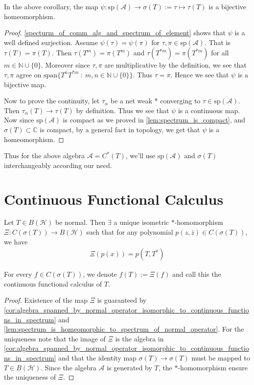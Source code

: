 \begin{lemma}
  \label{lem:spectrum_is_homeomorphic_to_spectrum_of_normal_operator}
  In the above corollary, the map $\psi: \textrm{sp}(\mathcal{A}) \to
  \sigma(T) := \tau \mapsto \tau(T)$ is a bijective homeomorphism.
\end{lemma}
\begin{proof}
  \autoref{specturm_of_comm_alg_and_spectrum_of_element} shows that
  $\psi$ is a well defined surjection. Assume $\psi(\tau) =
  \psi(\pi)$ for $ \tau, \pi \in \textrm{sp}(\mathcal{A})$.
  That is $\tau(T) = \pi(T)$. Then $\tau(T^m) = \pi(T^m)$
  and $\tau(T^{*m}) = \pi(T^{*m})$ for all $m \in \mathbb{N} \cup \{
  0 \}$. Moreover since $\tau, \pi$ are multiplicative by the
  definition, we see that $\tau, \pi$ agree on $\textrm{span}\{
  T^nT^{*m}  \ : \   m, n \in \mathbb{N} \cup \{ 0 \} \}$. Thus $\tau
  = \pi$. Hence we see that $\psi$ is a bijective map.

  Now to prove the continuity, let $\tau_\alpha$ be a net weak * converging
  to $\tau \in \textrm{sp}(\mathcal{A})$. Then $\tau_\alpha(T) \to
  \tau(T)$ by definition. Thus we see that $\psi$ is a continuous
  map. Now since $\textrm{sp}(\mathcal{A})$ is compact as we proved
  in \autoref{lem:spectrum_is_compact}, and $\sigma(T) \subset
  \mathbb{C}$ is compact, by a general fact in topology, we get that
  $\psi$ is a homeomorphism.
\end{proof}

Thus for the above algebra $\mathcal{A} = C^*(T)$, we'll use
$\textrm{sp}(\mathcal{A})$ and $\sigma(T)$ interchangeably according our need.

\section{Continuous Functional Calculus}

\begin{theorem}
  Let $T \in B(\mathcal{H})$ be normal. Then $\exists$ a unique
  isometric $*$-homomorphism $\Xi: C(\sigma(T)) \to  B(\mathcal{H})$
  such that for any polynomial $p(z, \bar{z}) \in C(\sigma(T))$, we have
  \begin{align*}
    \Xi(p(x)) = p(T, T^*)
  \end{align*}

  For every $f \in C(\sigma(T))$, we denote $f(T) := \Xi(f)$ and call
  this the continuous functional calculus of $T$.
\end{theorem}
\begin{proof}
  Existence of the map $\Xi$ is guaranteed by
  \autoref{cor:algebra_spanned_by_normal_operator_isomorphic_to_continuous_functions_in_spectrum}
  and \autoref{lem:spectrum_is_homeomorphic_to_spectrum_of_normal_operator}.
  For the uniqueness note that the image of $\Xi$ is the algebra in
  \autoref{cor:algebra_spanned_by_normal_operator_isomorphic_to_continuous_functions_in_spectrum}
  and that the identity map $\sigma(T) \to
  \sigma(T)$ must be mapped to $T \in B(\mathcal{H})$.
  Since the algebra $\mathcal{A}$ is generated by $T$, the
  $*$-homomorphism ensure the uniqueness of $\Xi$.
\end{proof}

